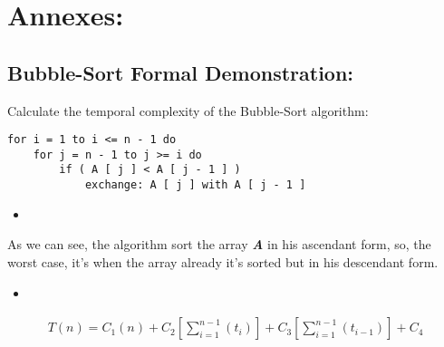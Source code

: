 \documentclass[10pt,a4paper]{article}
\begin{document}
{\bfseries\itshape\color{OliveGreen}{Observation:}} {\itshape{}} \hfill \break

\pagebreak

\section{Annexes:}

\subsection{Bubble-Sort Formal Demonstration:}

Calculate the temporal complexity of the Bubble-Sort algorithm: \hfill \break

\begin{lstlisting}
for i = 1 to i <= n - 1 do
	for j = n - 1 to j >= i do
		if ( A [ j ] < A [ j - 1 ] )
			exchange: A [ j ] with A [ j - 1 ]
\end{lstlisting}

\begin{itemize}
\item {\bfseries\itshape\color{CadetBlue}{Where n = A.length:}} \hfill
\end{itemize}

As we can see, the algorithm sort the array {\bfseries\itshape A} in his ascendant form, so, the worst case, it's when the array already it's sorted but in his descendant form.

\begin{itemize}
\item {\bfseries\itshape\color{Maroon}{Solution:}} \hfill
\end{itemize}

\begin{ceqn}
\begin{align}
T ( n ) = C_{1}( n ) + C_{2}[ \sum_{i = 1}^{n - 1} ( t_{i} ) ] + C_{3}[ \sum_{i = 1}^{n - 1} ( t_{i - 1} ) ] + C_{4}
\end{align}
\end{ceqn}

{\bfseries\itshape{}} \hfill \break
\end{document}
